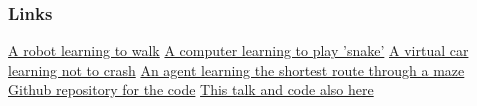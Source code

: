 \documentclass{beamer}
\begin{document}
  \begin{frame}
  	\frametitle{Links}
	\href{https://www.youtube.com/watch?v=CthhCy-1Jeg}{A robot learning to walk} \newline
	\href{https://www.youtube.com/watch?v=kM89G5dE-og}{A computer learning to play 'snake'} \newline
	\href{https://www.youtube.com/watch?v=zOgSC---rgM}{A virtual car learning not to crash} \newline
	\href{https://www.youtube.com/watch?v=X33xYf4UlVw}{An agent learning the shortest route through a maze} \newline
	\newline
	\href{https://github.com/geraintpalmer/Python_Namibia_2015}{Github repository for the code} \newline
	\href{http://geraintpalmer.github.io}{This talk and code also here}
  \end{frame}
  
\end{document}
